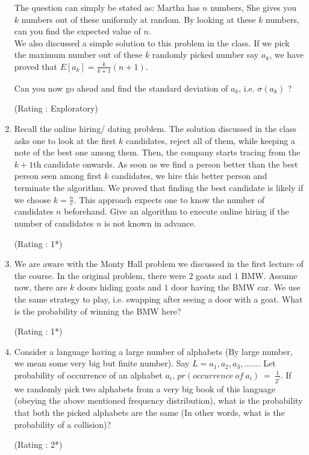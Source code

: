 \documentclass[paper=a4, fontsize=11pt]{scrartcl} %
\numberwithin{equation}{section} %
\numberwithin{figure}{section} %
\numberwithin{table}{section} %
\begin{document}
\begin{enumerate}
The question can simply be stated as: Martha has $n$ numbers, She gives you $k$ numbers out of these uniformly at random. By looking at these $k$ numbers, can you find the expected value of $n$.\\

We also discussed a simple solution to this problem in the class. If we pick the maximum number out of these $k$ randomly picked number say $a_k$, we have proved that $E[a_k]=\frac{k}{k+1} (n+1)$. 

Can you now go ahead and find the standard deviation of $a_k$, i.e. $\sigma(a_k)$ ?
\begin{flushright}
\small{(Rating : Exploratory)}
\end{flushright}
\vspace{0.2cm}
 
\item Recall the online hiring/ dating problem. The solution discussed in the class asks one to look at the first $k$ candidates, reject all of them, while keeping a note of the best one among them. Then, the company starts tracing from the $k+1$th candidate onwards. As soon as we find a person better than the best person seen among first $k$ candidates, we hire this better person and terminate the algorithm. We proved that finding the best candidate is likely if we choose $k=\frac{n}{e}$. This approach expects one to know the number of candidates $n$ beforehand. Give an algorithm to execute online hiring if the number of candidates $n$ is not known in advance. 
\begin{flushright}
\small{(Rating : 1*)}
\end{flushright}
\vspace{0.2cm}

\item We are aware with the Monty Hall problem we discussed in the first lecture of the course. In the original problem, there were $2$ goats and $1$ BMW. Assume now, there are $k$ doors hiding goats and $1$ door having the BMW car. We use the same strategy to play, i.e. swapping after seeing a door with a goat. What is the probability of winning the BMW here? 
\begin{flushright}
\small{(Rating : 1*)}
\end{flushright}
\vspace{0.2cm}

\item Consider a language having a large number of alphabets (By large number, we mean some very big but finite number). Say $L={a_1, a_2, a_3, ......}$. Let probability of occurrence of an alphabet $a_i$, $pr(occurrence\ of\ a_i )\ =\ \frac{1}{2^i}$. If we randomly pick two alphabets from a very big book of this language (obeying the above mentioned frequency distribution), what is the probability that both the picked alphabets are the same (In other words, what is the probability of a collision)? 
\begin{flushright}
\small{(Rating : 2*)}
\end{flushright}
\vspace{0.2cm}


\end{enumerate}
\end{document}
